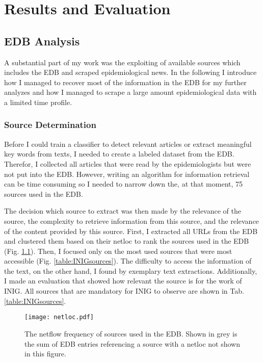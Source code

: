 \chapter{Results and Evaluation}

\section{EDB Analysis}\label{edb analysis}
A substantial part of my work was the exploiting of available sources which includes the EDB and scraped epidemiological news. In the following I introduce how I managed to recover most of the information in the EDB for my further analyzes and how I managed to scrape a large amount epidemiological data with a limited time profile.

\subsection{Source Determination}
Before I could train a classifier to detect relevant articles or extract meaningful key words from texts, I needed to create a labeled dataset from the EDB. Therefor, I collected all articles that were read by the epidemiologists but were not put into the EDB. However, writing an algorithm for information retrieval can be time consuming so I needed to narrow down the, at that moment, 75 sources used in the EDB.

The decision which source to extract was then made by the relevance of the source, the complexity to retrieve information from this source, and the relevance of the content provided by this source.
First, I extracted all URLs from the EDB and clustered them based on their netloc to rank the sources used in the EDB (Fig. \ref{fig:netloc}). Then, I focused only on the most used sources that were most accessible (Fig. \ref{table:INIGsources}). The difficulty to access the information of the text, on the other hand, I found by exemplary text extractions. Additionally, I made an evaluation that showed how relevant the source is for the work of INIG. All sources that are mandatory for INIG to observe are shown in Tab. \ref{table:INIGsources}.

\begin{figure}[h!]
    \centering
    \texttt{[image: netloc.pdf]}
    \caption{The netflow frequency of sources used in the EDB. Shown in grey is the sum of EDB entries referencing a source with a netloc not shown in this figure.}
    \label{fig:netloc}
\end{figure}


